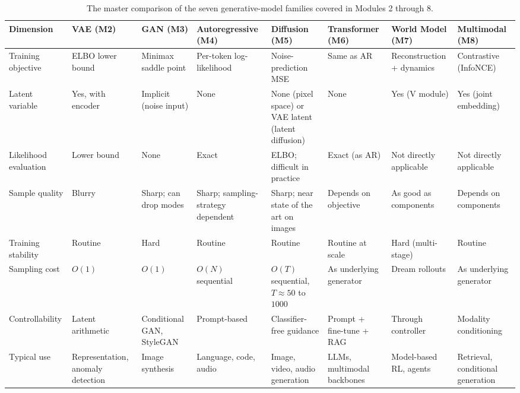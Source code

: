 \documentclass[11pt]{article}
\theoremstyle{remark}
\begin{document}
\begin{landscape}
\begin{table}[p]
\centering
\footnotesize
\setlength{\tabcolsep}{3pt}
\renewcommand{\arraystretch}{1.25}
\begin{tabular}{@{}>{\raggedright\arraybackslash}p{1.05in}
                  >{\raggedright\arraybackslash}p{1.0in}
                  >{\raggedright\arraybackslash}p{1.0in}
                  >{\raggedright\arraybackslash}p{1.05in}
                  >{\raggedright\arraybackslash}p{1.15in}
                  >{\raggedright\arraybackslash}p{1.0in}
                  >{\raggedright\arraybackslash}p{1.05in}
                  >{\raggedright\arraybackslash}p{1.05in}@{}}
\toprule
\textbf{Dimension} & \textbf{VAE (M2)} & \textbf{GAN (M3)} & \textbf{Autoregressive (M4)} & \textbf{Diffusion (M5)} & \textbf{Transformer (M6)} & \textbf{World Model (M7)} & \textbf{Multimodal (M8)} \\
\midrule
Training objective & ELBO lower bound & Minimax saddle point & Per-token log-likelihood & Noise-prediction MSE & Same as AR & Reconstruction + dynamics & Contrastive (InfoNCE) \\
Latent variable & Yes, with encoder & Implicit (noise input) & None & None (pixel space) or VAE latent (latent diffusion) & None & Yes (V module) & Yes (joint embedding) \\
Likelihood evaluation & Lower bound & None & Exact & ELBO; difficult in practice & Exact (as AR) & Not directly applicable & Not directly applicable \\
Sample quality & Blurry & Sharp; can drop modes & Sharp; sampling-strategy dependent & Sharp; near state of the art on images & Depends on objective & As good as components & Depends on components \\
Training stability & Routine & Hard & Routine & Routine & Routine at scale & Hard (multi-stage) & Routine \\
Sampling cost & $O(1)$ & $O(1)$ & $O(N)$ sequential & $O(T)$ sequential, $T \approx 50$ to $1000$ & As underlying generator & Dream rollouts & As underlying generator \\
Controllability & Latent arithmetic & Conditional GAN, StyleGAN & Prompt-based & Classifier-free guidance & Prompt + fine-tune + RAG & Through controller & Modality conditioning \\
Typical use & Representation, anomaly detection & Image synthesis & Language, code, audio & Image, video, audio generation & LLMs, multimodal backbones & Model-based RL, agents & Retrieval, conditional generation \\
\bottomrule
\end{tabular}
\caption{The master comparison of the seven generative-model families covered in Modules 2 through 8.}
\label{tab:families}
\end{table}
\end{landscape}
\end{document}
